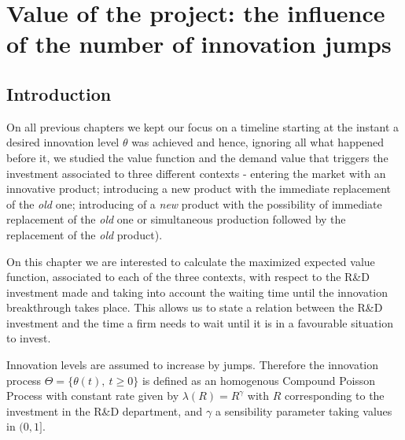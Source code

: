 \chapter{Value of the project: the influence of the number of innovation jumps}
\label{chapter:max}



\section{Introduction}
\label{section:max_intro}

On all previous chapters we kept our focus on a timeline starting at the instant a desired innovation level $\theta$ was achieved and hence, ignoring all what happened before it, we 
studied the value function and the demand value that triggers the investment associated to three different contexts - entering the market with an innovative product; introducing a new product with the immediate replacement of the \textit{old} one; introducing of a \textit{new} product with the possibility of immediate replacement of the \textit{old} one or simultaneous production followed by the replacement of the \textit{old} product).

On this chapter we are interested to calculate the maximized expected value function, associated to each of the three contexts, with respect to the R\&D investment made and taking into account the waiting time until the innovation breakthrough takes place.
This allows us to state a relation between the R\&D investment and the time a firm needs to wait until it is in a favourable situation to invest.



Innovation levels are assumed to increase by jumps. Therefore the innovation process
$\Theta=\{ \theta(t), \ t \geq 0 \}$ is defined as an homogenous Compound Poisson Process with constant rate given by $\lambda(R)=R^\gamma$ with $R$ corresponding to the investment in the R\&D department, and $\gamma$ a sensibility parameter taking values in $(0,1]$.

